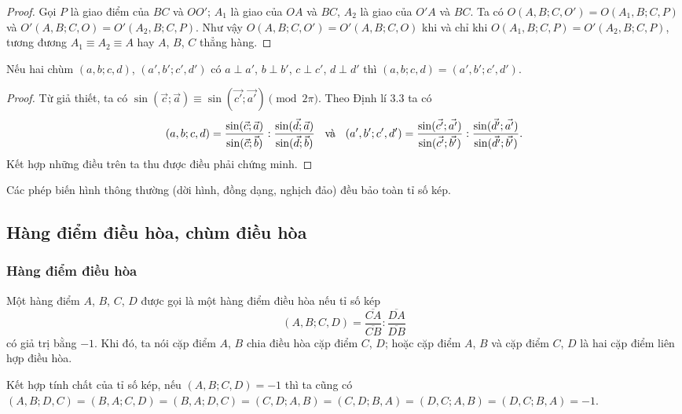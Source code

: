         \begin{proof}
            Gọi \(P\) là giao điểm của \(BC\) và \(OO'\); \(A_1\) là giao của \(OA\) và \(BC\), \(A_2\) là giao của \(O'A\) và \(BC\). Ta có \(O(A,B;C,O') = O(A_1,B;C,P)\) và \(O'(A,B;C,O) = O'(A_2,B;C,P)\). Như vậy \(O(A,B;C,O') = O'(A,B;C,O)\) khi và chỉ khi \(O(A_1,B;C,P) = O'(A_2,B;C,P)\), tương đương \(A_1 \equiv A_2 \equiv A\) hay \(A\), \(B\), \(C\) thẳng hàng.
        \end{proof}

        \begin{property}
            Nếu hai chùm \((a,b;c,d)\), \((a',b';c',d')\) có \(a \perp a'\), \(b \perp b'\), \(c \perp c'\), \(d \perp d'\) thì \((a,b;c,d) = (a',b';c',d')\).
        \end{property}

        \begin{proof}
            Từ giả thiết, ta có \(\sin(\vec{c};\vec{a}) \equiv \sin(\vec{c'};\vec{a'}) \pmod{2\pi}\). Theo Định lí 3.3 ta có
            \[(a,b;c,d) = \frac{\sin(\vec{c};\vec{a})}{\sin(\vec{c};\vec{b})} : \frac{\sin(\vec{d};\vec{a})}{\sin(\vec{d};\vec{b})} \hspace{0.2cm} \text{ và } \hspace{0.2cm} (a',b';c',d') = \frac{\sin(\vec{c'};\vec{a'})}{\sin(\vec{c'};\vec{b'})} : \frac{\sin(\vec{d'};\vec{a'})}{\sin(\vec{d'};\vec{b'})}.\]
            Kết hợp những điều trên ta thu được điều phải chứng minh.
        \end{proof}

        \begin{property}
            Các phép biến hình thông thường (dời hình, đồng dạng, nghịch đảo) đều bảo toàn tỉ số kép.  
        \end{property}

    \subsection{Hàng điểm điều hòa, chùm điều hòa}

    \subsubsection*{Hàng điểm điều hòa}

        \begin{definition}
            Một hàng điểm \(A\), \(B\), \(C\), \(D\) được gọi là một hàng điểm điều hòa nếu tỉ số kép \[(A,B;C,D) = \frac{\overline{CA}}{\overline{CB}} : \frac{\overline{DA}}{\overline{DB}}\] có giả trị bằng \(-1\). Khi đó, ta nói cặp điểm \(A\), \(B\) chia điều hòa cặp điểm \(C\), \(D\); hoặc cặp điểm \(A\), \(B\) và cặp điểm \(C\), \(D\) là hai cặp điểm liên hợp điều hòa.

            Kết hợp tính chất của tỉ số kép, nếu \((A,B;C,D) = -1\) thì ta cũng có \((A,B;D,C) = (B,A;C,D) = (B,A;D,C) = (C,D;A,B) = (C,D;B,A) = (D,C;A,B) = (D,C;B,A) = -1\).
        \end{definition}

